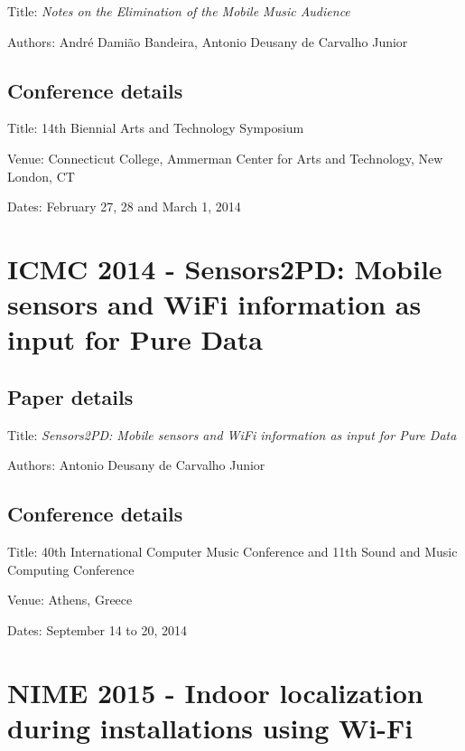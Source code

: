 Title: \textit{Notes on the Elimination of the Mobile Music Audience}

Authors: André Damião Bandeira, Antonio Deusany de Carvalho Junior

\subsection*{Conference details}

Title: 14th Biennial Arts and Technology Symposium

Venue: Connecticut College, Ammerman Center for Arts and Technology, New London, CT

Dates: February 27, 28 and March 1, 2014





\section{ICMC 2014 - Sensors2PD: Mobile sensors and WiFi information as input for Pure Data}
\label{ape:papericmc2014}

\subsection*{Paper details}

Title: \textit{Sensors2PD: Mobile sensors and WiFi information as input for Pure Data}

Authors: Antonio Deusany de Carvalho Junior

\subsection*{Conference details}

Title: 40th International Computer Music Conference and 11th Sound and Music Computing Conference

Venue: Athens, Greece

Dates: September 14 to 20, 2014 



\section{NIME 2015 - Indoor localization during installations using Wi-Fi}
\label{ape:papernime2015}

